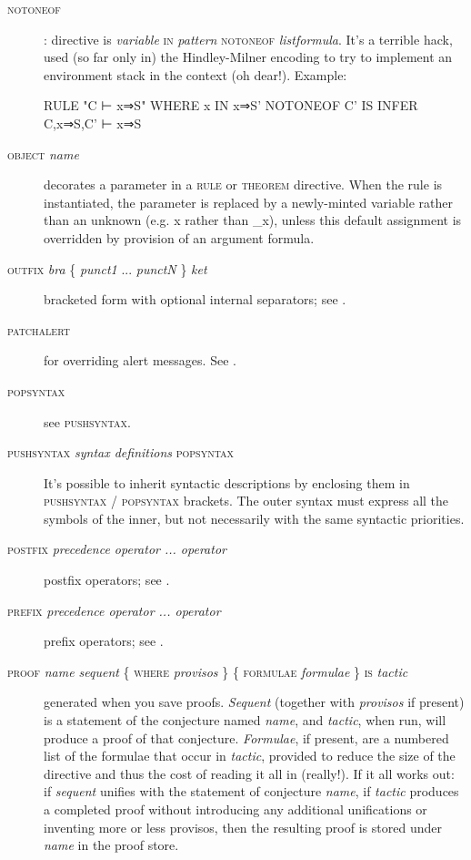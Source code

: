 \begin{description}
\item[\textsc{notoneof}]: directive is \textit{variable} \textsc{in} \textit{pattern} \textsc{notoneof} \textit{listformula}. It's a terrible hack, used (so far only in) the Hindley-Milner encoding to try to implement an environment stack in the context (oh dear!). Example:
\begin{japeish}
RULE "C ⊢ x⇒S" WHERE x IN x⇒S' NOTONEOF C' IS INFER C,x⇒S,C' ⊢ x⇒S
\end{japeish}

\item[\textsc{object} \textit{name}] decorates a parameter in a \textsc{rule} or \textsc{theorem} directive. When the rule is instantiated, the parameter is replaced by a newly-minted variable rather than an unknown (e.g. x rather than \_x), unless this default assignment is overridden by provision of an argument formula.

\item[\textsc{outfix} \textit{bra} \{ \textit{punct1} ... \textit{punctN} \} \textit{ket}] bracketed form with optional internal separators; see .

\item[\textsc{patchalert}] for overriding alert messages. See .

\item[\textsc{popsyntax}] see \textsc{pushsyntax}.

\item[\textsc{pushsyntax} \textit{syntax definitions} \textsc{popsyntax}] It's possible to inherit  syntactic descriptions by enclosing them in \textsc{pushsyntax} / \textsc{popsyntax} brackets. The outer syntax must express all the symbols of the inner, but not necessarily with the same syntactic priorities.

\item[\textsc{postfix} \textit{precedence operator ... operator}] postfix operators; see .

\item[\textsc{prefix} \textit{precedence operator ... operator}] prefix operators; see .

\item[\textsc{proof} \textit{name sequent} \{ \textsc{where} \textit{provisos} \} \{ \textsc{formulae} \textit{formulae} \} \textsc{is} \textit{tactic}] generated when you save proofs. \textit{Sequent} (together with \textit{provisos} if present) is a statement of the conjecture named \textit{name}, and \textit{tactic}, when run, will produce a proof of that conjecture. \textit{Formulae}, if present, are a numbered list of the formulae that occur in \textit{tactic}, provided to reduce the size of the directive and thus the cost of reading it all in (really!). If it all works out: if \textit{sequent} unifies with the statement of conjecture \textit{name}, if \textit{tactic} produces a completed proof without introducing any additional unifications or inventing more or less provisos, then the resulting proof is stored under \textit{name} in the proof store.


\end{description}

